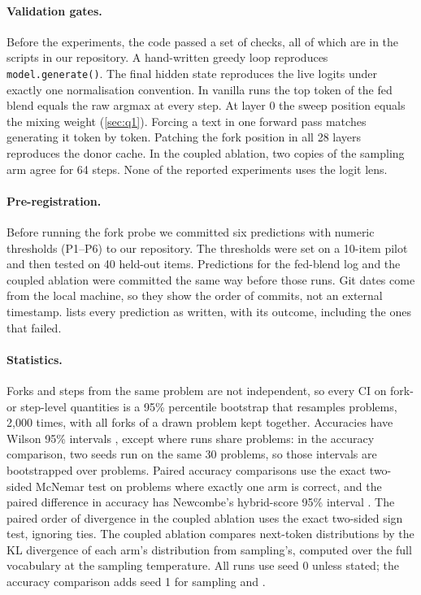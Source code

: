 \paragraph{Validation gates.}
Before the experiments, the code passed a set of checks, all of which are in the scripts in our repository.
A hand-written greedy loop reproduces \texttt{model.generate()}.
The final hidden state reproduces the live logits under exactly one normalisation convention.
In vanilla runs the top token of the fed blend equals the raw argmax at every step. %
At layer 0 the sweep position equals the mixing weight (\cref{sec:q1}).
Forcing a text in one forward pass matches generating it token by token.
Patching the fork position in all 28 layers reproduces the donor cache. %
In the coupled ablation, two copies of the sampling arm agree for 64 steps. %
None of the reported experiments uses the logit lens.

\paragraph{Pre-registration.}
Before running the fork probe we committed six predictions with numeric thresholds (P1--P6) to our repository.
The thresholds were set on a 10-item pilot and then tested on 40 held-out items. %
Predictions for the fed-blend log and the coupled ablation were committed the same way before those runs.
Git dates come from the local machine, so they show the order of commits, not an external timestamp.
 lists every prediction as written, with its outcome, including the ones that failed.

\paragraph{Statistics.}
Forks and steps from the same problem are not independent, so every CI on fork- or step-level quantities is a
95\% percentile bootstrap that resamples problems, 2,000 times, with all forks of a drawn problem kept together. %
Accuracies have Wilson 95\% intervals \cite{wilson1927probable}, except where runs share problems: in the
accuracy comparison, two seeds run on the same 30 problems, so those intervals are bootstrapped over problems. %
Paired accuracy comparisons use the exact two-sided McNemar test \cite{mcnemar1947note} on problems where exactly
one arm is correct, and the paired difference in accuracy has Newcombe's hybrid-score 95\% interval
\cite{newcombe1998improved}.
The paired order of divergence in the coupled ablation uses the exact two-sided sign test, ignoring ties.
The coupled ablation compares next-token distributions by the KL divergence of each arm's distribution from sampling's, computed
over the full vocabulary at the sampling temperature.
All runs use seed 0 unless stated; the accuracy comparison adds seed 1 for sampling and \GST{}. %
